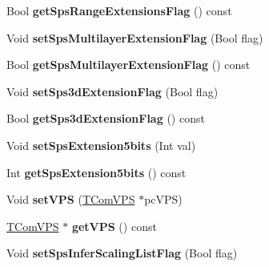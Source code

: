 \begin{DoxyCompactItemize}
\item 
\mbox{\label{class_t_com_s_p_s_a25f3155c212e841f5f0baa4b90660771}} 
Bool {\bfseries get\+Sps\+Range\+Extensions\+Flag} () const
\item 
\mbox{\label{class_t_com_s_p_s_a838888d6a01ae9e844e1314c09a1ef00}} 
Void {\bfseries set\+Sps\+Multilayer\+Extension\+Flag} (Bool flag)
\item 
\mbox{\label{class_t_com_s_p_s_a0fdc89d13b2472e697486c3c5debfe30}} 
Bool {\bfseries get\+Sps\+Multilayer\+Extension\+Flag} () const
\item 
\mbox{\label{class_t_com_s_p_s_a41d86372eed144182198a9487579639a}} 
Void {\bfseries set\+Sps3d\+Extension\+Flag} (Bool flag)
\item 
\mbox{\label{class_t_com_s_p_s_ad4149671601d30e84137c680c4cfcfc2}} 
Bool {\bfseries get\+Sps3d\+Extension\+Flag} () const
\item 
\mbox{\label{class_t_com_s_p_s_a1faf77ddc75fceee6bd4a797c314516b}} 
Void {\bfseries set\+Sps\+Extension5bits} (Int val)
\item 
\mbox{\label{class_t_com_s_p_s_a2874fa2764b6bde7231337251a771ffa}} 
Int {\bfseries get\+Sps\+Extension5bits} () const
\item 
\mbox{\label{class_t_com_s_p_s_a5c337cd6363e615121e3cb3e2511a56d}} 
Void {\bfseries set\+V\+PS} (\hyperlink{class_t_com_v_p_s}{T\+Com\+V\+PS} $\ast$pc\+V\+PS)
\item 
\mbox{\label{class_t_com_s_p_s_afc80fd142b8a48ab3cc73b365216949f}} 
\hyperlink{class_t_com_v_p_s}{T\+Com\+V\+PS} $\ast$ {\bfseries get\+V\+PS} () const
\item 
\mbox{\label{class_t_com_s_p_s_a6122477824c161d59ed35a0a3fc3d910}} 
Void {\bfseries set\+Sps\+Infer\+Scaling\+List\+Flag} (Bool flag)
\item 
\mbox{\label{class_t_com_s_p_s_a3e81045e6087ad1ab7ac2ec843d147e7}} 

\end{DoxyCompactItemize}
